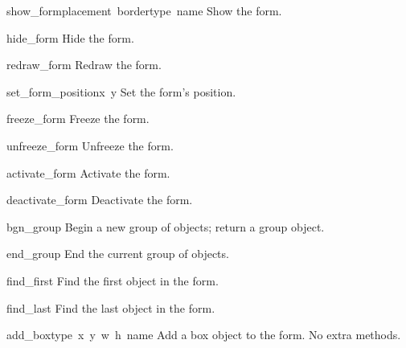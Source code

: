 \begin{flushleft}
\begin{funcdesc}{show_form}{placement\, bordertype\, name}
  Show the form.
\end{funcdesc}

\begin{funcdesc}{hide_form}{}
  Hide the form.
\end{funcdesc}

\begin{funcdesc}{redraw_form}{}
  Redraw the form.
\end{funcdesc}

\begin{funcdesc}{set_form_position}{x\, y}
Set the form's position.
\end{funcdesc}

\begin{funcdesc}{freeze_form}{}
Freeze the form.
\end{funcdesc}

\begin{funcdesc}{unfreeze_form}{}
  Unfreeze the form.
\end{funcdesc}

\begin{funcdesc}{activate_form}{}
  Activate the form.
\end{funcdesc}

\begin{funcdesc}{deactivate_form}{}
  Deactivate the form.
\end{funcdesc}

\begin{funcdesc}{bgn_group}{}
  Begin a new group of objects; return a group object.
\end{funcdesc}

\begin{funcdesc}{end_group}{}
  End the current group of objects.
\end{funcdesc}

\begin{funcdesc}{find_first}{}
  Find the first object in the form.
\end{funcdesc}

\begin{funcdesc}{find_last}{}
  Find the last object in the form.
\end{funcdesc}


\begin{funcdesc}{add_box}{type\, x\, y\, w\, h\, name}
Add a box object to the form.
No extra methods.
\end{funcdesc}


\end{flushleft}
